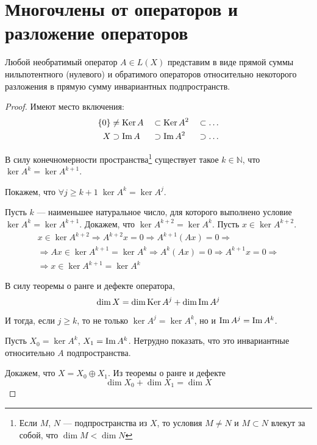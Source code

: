 \section{Многочлены от операторов и разложение операторов}
\begin{lemma} \label{le:noninvertibledevcomposition}
    Любой необратимый оператор $A\in L(X)$ представим в виде прямой суммы
    нильпотентного (нулевого) и обратимого операторов относительно некоторого
    разложения в прямую сумму инвариантных подпространств.
\end{lemma}

\begin{proof}
    Имеют место включения:
    \begin{alignat*}{3}
        \left\{0\right\} & \neq \operatorname{Ker} A &&\subset \operatorname{Ker} A^2 &&\subset \dots \\
        X & \supset \operatorname{Im} A &&\supset \operatorname{Im} A^2 &&\supset \dots
    \end{alignat*}

    В силу конечномерности пространства\footnote{Если $M$, $N$ — подпространства из $X$,
    то условия $M \neq N$ и $M \subset N$ влекут за собой, что $\dim M < \dim N$} 
    существует такое $k \in \mathbb{N}$, что $\ker A^k = \ker A^{k+1}$.

    Покажем, что $\forall j \geq k+1 \; \ker A^k = \ker A^j$.
    
    Пусть $k$ — наименьшее натуральное число, для которого выполнено условие $\ker A^k = \ker
    A^{k+1}$. Докажем, что $\ker A^{k+2} = \ker A^k$. Пусть $x \in \ker
    A^{k+2}$.
    \begin{multline*}
        x \in \ker A^{k+2} \Rightarrow A^{k+2}x = 0 \Rightarrow A^{k+1}(Ax) = 0
        \Rightarrow \\ \Rightarrow Ax \in \ker A^{k+1} = \ker A^{k} \Rightarrow
        A^k(Ax) = 0 \Rightarrow A^{k+1}x = 0 \Rightarrow \\ \Rightarrow x \in \ker A^{k+1} =
        \ker A^k
    \end{multline*}

    В силу теоремы о ранге и дефекте оператора,
    \[ \dim X = \dim \operatorname{Ker} A^j + \dim \operatorname{Im} A^j \]
    
    И тогда, если $j \geq k$, то не только $\ker A^j = \ker A^k$, но и $\operatorname{Im} A^j = \operatorname{Im} A^k$.

    Пусть $X_0 = \ker A^k$, $X_1 = \operatorname{Im} A^k$. Нетрудно показать, что это инвариантные относительно $A$
    подпространства.

    Докажем, что $ X = X_0 \oplus X_1 $. Из теоремы о ранге и дефекте
    \[ \dim X_0 + \dim X_1 = \dim X \]


\end{proof}
